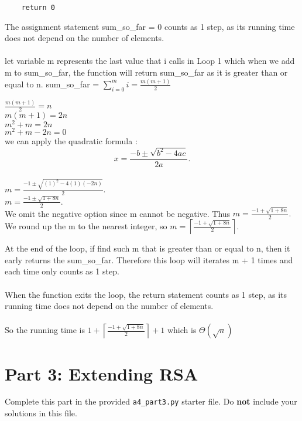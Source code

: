 \documentclass[11pt]{article}
\newcommand{\ceil}[1]{\left\lceil #1 \right\rceil}
\begin{document}
\begin{enumerate}
\begin{verbatim}
    return 0
\end{verbatim}

The assignment statement sum\_so\_far = 0 counts as 1 step, as its running time does not depend on the number of elements. \\
\\
let variable m represents the last value that i calls in Loop 1 which when we add m to sum\_so\_far, the function will return sum\_so\_far as it is greater than or equal to n. sum\_so\_far = $\sum_{i=0}^{m}i = \frac{m(m+1)}{2}$
\begin{center}
    $\frac{m(m+1)}{2} = n$\\
    $m(m+1)=2n$ \\
    $m^{2} + m = 2n$\\
    $m^{2} + m - 2n = 0$ \\
    we can apply the quadratic formula : $$x=\frac{-b\pm \sqrt{b^2-4ac}}{2a}.$$\\
    $m=\frac{-1\pm \sqrt{(1)^2-4(1)(-2n)}}{2}.$\\
    $m=\frac{-1\pm \sqrt{1+8n}}{2}.$ \\
    We omit the negative option since m cannot be negative. Thus $m=\frac{-1 + \sqrt{1+8n}}{2}.$ \\
    We round up the m to the nearest integer, so $m =\ceil{\frac{-1 + \sqrt{1+8n}}{2}}.$
\end{center}
At the end of the loop, if find such m that is greater than or equal to n, then it early returns the sum\_so\_far. Therefore this loop will iterates m + 1 times and each time only counts as 1 step.\\
\\
When the function exits the loop, the return statement counts as 1 step, as its running time does not depend on the number of elements.\\
\\
So the running time is $1+\ceil{\frac{-1 + \sqrt{1+8n}}{2}} + 1$ which is $\Theta(\sqrt{n})$


\end{enumerate}

\newpage

\section*{Part 3: Extending RSA}

Complete this part in the provided \texttt{a4\_part3.py} starter file.
Do \textbf{not} include your solutions in this file.
\end{document}
